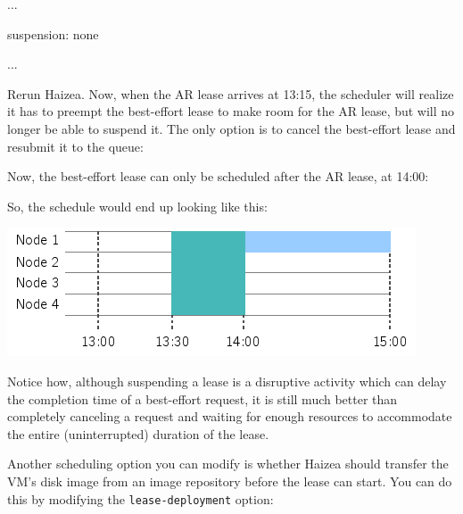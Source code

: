 \begin{wideshellverbatim}
[scheduling]
...

suspension: none

...
\end{wideshellverbatim}

Rerun Haizea. Now, when the AR lease arrives at 13:15, the scheduler will realize it has to preempt the best-effort lease to make room for the AR lease, but will no longer be able to suspend it. The only option is to cancel the best-effort lease and resubmit it to the queue:


Now, the best-effort lease can only be scheduled after the AR lease, at 14:00:


So, the schedule would end up looking like this:

\begin{center}
\includegraphics{images/quickstart_leasegraph4.png}
\end{center}

Notice how, although suspending a lease is a disruptive activity which can delay the completion time of a best-effort request, it is still much better than completely canceling a request and waiting for enough resources to accommodate the entire (uninterrupted) duration of the lease.

Another scheduling option you can modify is whether Haizea should transfer the VM's disk image from an image repository before the lease can start. You can do this by modifying the \texttt{lease-deployment} option:

